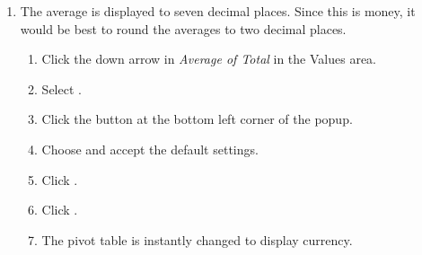 \begin{enumerate}[resume]
	\item The average is displayed to seven decimal places. Since this is money, it would be best to round the averages to two decimal places.

	\begin{enumerate}
		\item Click the down arrow in \textit{Average of Total} in the Values area. 
		\item Select .
		\item Click the  button at the bottom left corner of the  popup.
		\item Choose  and accept the default settings.
		\item Click .
		\item Click .
		\item The pivot table is instantly changed to display currency.
	\end{enumerate}
	

\end{enumerate}
